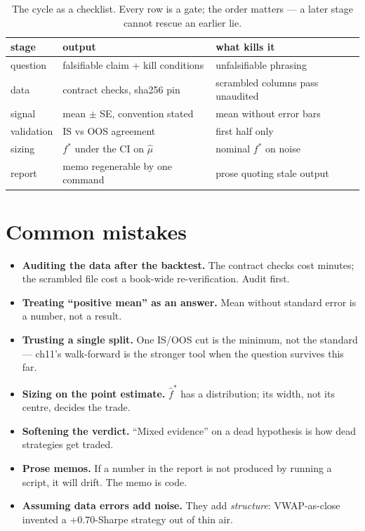 \begin{table}[htbp]\centering\small
\begin{tabular}{lll}
\toprule
stage & output & what kills it\\\midrule
question & falsifiable claim + kill conditions & unfalsifiable phrasing\\
data & contract checks, sha256 pin & scrambled columns pass unaudited\\
signal & mean $\pm$ SE, convention stated & mean without error bars\\
validation & IS vs OOS agreement & first half only\\
sizing & $f^*$ under the CI on $\hat\mu$ & nominal $f^*$ on noise\\
report & memo regenerable by one command & prose quoting stale output\\
\bottomrule
\end{tabular}
\caption{The cycle as a checklist. Every row is a gate; the
order matters --- a later stage cannot rescue an earlier lie.}
\end{table}

\section{Common mistakes}
\begin{itemize}
\item \textbf{Auditing the data after the backtest.} The
contract checks cost minutes; the scrambled file cost a
book-wide re-verification. Audit first.
\item \textbf{Treating ``positive mean'' as an answer.} Mean
without standard error is a number, not a result.
\item \textbf{Trusting a single split.} One IS/OOS cut is the
minimum, not the standard --- ch11's walk-forward is the
stronger tool when the question survives this far.
\item \textbf{Sizing on the point estimate.} $\hat f^*$ has a
distribution; its width, not its centre, decides the trade.
\item \textbf{Softening the verdict.} ``Mixed evidence'' on a
dead hypothesis is how dead strategies get traded.
\item \textbf{Prose memos.} If a number in the report is not
produced by running a script, it will drift. The memo is code.
\item \textbf{Assuming data errors add noise.} They add
\emph{structure}: VWAP-as-close invented a +0.70-Sharpe
strategy out of thin air.
\end{itemize}


